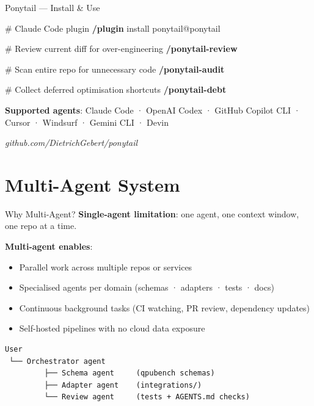 \documentclass[
  ignorenonframetext,
  aspectratio=169,
]{beamer}
\newenvironment{Shaded}{\begin{snugshade}}{\end{snugshade}}
\newcommand{\CommentTok}[1]{\textcolor[rgb]{0.48,0.49,0.49}{#1}}
\newcommand{\ExtensionTok}[1]{\textcolor[rgb]{0.00,0.60,1.00}{\textbf{#1}}}
\newcommand{\NormalTok}[1]{\textcolor[rgb]{0.81,0.81,0.76}{#1}}
\providecommand{\tightlist}{%
  \setlength{\itemsep}{0pt}\setlength{\parskip}{0pt}}
\begin{document}
\begin{frame}[fragile]{Ponytail --- Install \& Use}
\label{ponytail-install-use}
\begin{Shaded}
\begin{Highlighting}[]
\CommentTok{\# Claude Code plugin}
\ExtensionTok{/plugin}\NormalTok{ install ponytail@ponytail}

\CommentTok{\# Review current diff for over{-}engineering}
\ExtensionTok{/ponytail{-}review}

\CommentTok{\# Scan entire repo for unnecessary code}
\ExtensionTok{/ponytail{-}audit}

\CommentTok{\# Collect deferred optimisation shortcuts}
\ExtensionTok{/ponytail{-}debt}
\end{Highlighting}
\end{Shaded}

\textbf{Supported agents}: Claude Code · OpenAI Codex · GitHub Copilot
CLI · Cursor · Windsurf · Gemini CLI · Devin

\vspace{0.3em}

\emph{github.com/DietrichGebert/ponytail}
\end{frame}

\section{Multi-Agent System}\label{multi-agent-system}

\begin{frame}[fragile]{Why Multi-Agent?}
\label{why-multi-agent}
\textbf{Single-agent limitation}: one agent, one context window, one
repo at a time.

\textbf{Multi-agent enables}:

\begin{itemize}
\tightlist
\item
  Parallel work across multiple repos or services
\item
  Specialised agents per domain (schemas · adapters · tests · docs)
\item
  Continuous background tasks (CI watching, PR review, dependency
  updates)
\item
  Self-hosted pipelines with no cloud data exposure
\end{itemize}

\vspace{0.3em}

\begin{verbatim}
User
 └── Orchestrator agent
         ├── Schema agent     (qpubench schemas)
         ├── Adapter agent    (integrations/)
         └── Review agent     (tests + AGENTS.md checks)
\end{verbatim}
\end{frame}
\end{document}
